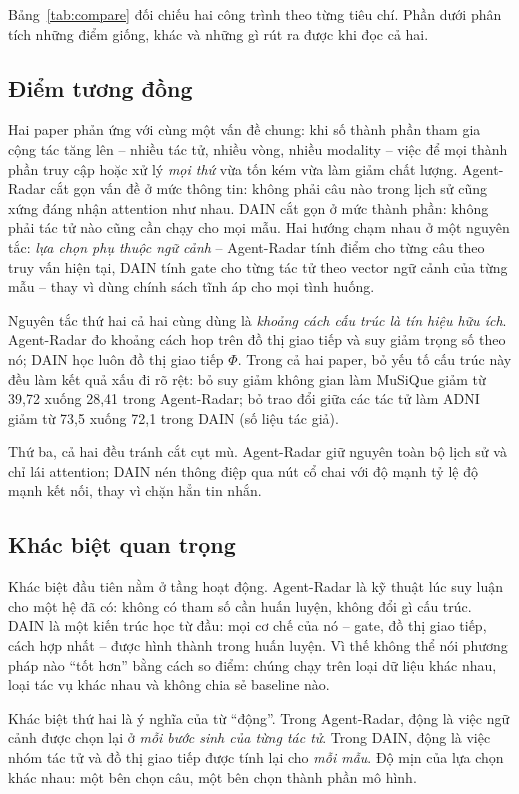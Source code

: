 Bảng~\ref{tab:compare} đối chiếu hai công trình theo từng tiêu chí. Phần dưới phân tích những điểm giống, khác và những gì rút ra được khi đọc cả hai.

\subsection{Điểm tương đồng}
Hai paper phản ứng với cùng một vấn đề chung: khi số thành phần tham gia cộng tác tăng lên -- nhiều tác tử, nhiều vòng, nhiều modality -- việc để mọi thành phần truy cập hoặc xử lý \emph{mọi thứ} vừa tốn kém vừa làm giảm chất lượng. Agent-Radar cắt gọn vấn đề ở mức thông tin: không phải câu nào trong lịch sử cũng xứng đáng nhận attention như nhau. DAIN cắt gọn ở mức thành phần: không phải tác tử nào cũng cần chạy cho mọi mẫu. Hai hướng chạm nhau ở một nguyên tắc: \emph{lựa chọn phụ thuộc ngữ cảnh} -- Agent-Radar tính điểm cho từng câu theo truy vấn hiện tại, DAIN tính gate cho từng tác tử theo vector ngữ cảnh của từng mẫu -- thay vì dùng chính sách tĩnh áp cho mọi tình huống.

Nguyên tắc thứ hai cả hai cùng dùng là \emph{khoảng cách cấu trúc là tín hiệu hữu ích}. Agent-Radar đo khoảng cách hop trên đồ thị giao tiếp và suy giảm trọng số theo nó; DAIN học luôn đồ thị giao tiếp $\Phi$. Trong cả hai paper, bỏ yếu tố cấu trúc này đều làm kết quả xấu đi rõ rệt: bỏ suy giảm không gian làm MuSiQue giảm từ 39,72 xuống 28,41 trong Agent-Radar; bỏ trao đổi giữa các tác tử làm ADNI giảm từ 73,5 xuống 72,1 trong DAIN (số liệu tác giả).

Thứ ba, cả hai đều tránh cắt cụt mù. Agent-Radar giữ nguyên toàn bộ lịch sử và chỉ lái attention; DAIN nén thông điệp qua nút cổ chai với độ mạnh tỷ lệ độ mạnh kết nối, thay vì chặn hẳn tin nhắn.

\subsection{Khác biệt quan trọng}
Khác biệt đầu tiên nằm ở tầng hoạt động. Agent-Radar là kỹ thuật lúc suy luận cho một hệ đã có: không có tham số cần huấn luyện, không đổi gì cấu trúc. DAIN là một kiến trúc học từ đầu: mọi cơ chế của nó -- gate, đồ thị giao tiếp, cách hợp nhất -- được hình thành trong huấn luyện. Vì thế không thể nói phương pháp nào ``tốt hơn'' bằng cách so điểm: chúng chạy trên loại dữ liệu khác nhau, loại tác vụ khác nhau và không chia sẻ baseline nào.

Khác biệt thứ hai là ý nghĩa của từ ``động''. Trong Agent-Radar, động là việc ngữ cảnh được chọn lại ở \emph{mỗi bước sinh của từng tác tử}. Trong DAIN, động là việc nhóm tác tử và đồ thị giao tiếp được tính lại cho \emph{mỗi mẫu}. Độ mịn của lựa chọn khác nhau: một bên chọn câu, một bên chọn thành phần mô hình.

